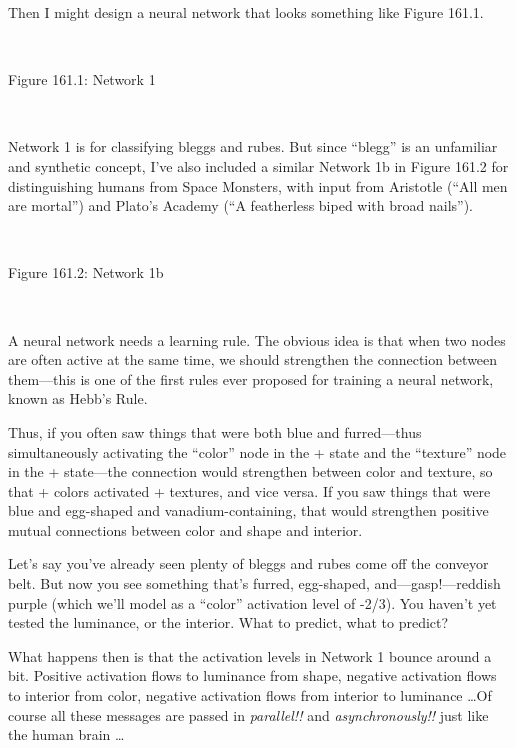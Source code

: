 {
 Then I might design a neural network that looks something like
Figure 161.1.}

{
 ~}

{\centering
{}
 \newline
 Figure 161.1: Network 1
\par}


\bigskip

{
 ~}

{
 Network 1 is for classifying bleggs and rubes. But since
``blegg'' is an unfamiliar and
synthetic concept, I've also included a similar Network
1b in Figure 161.2 for distinguishing humans from Space Monsters, with
input from Aristotle (``All men are
mortal'') and Plato's Academy
(``A featherless biped with broad
nails'').}

{
 ~}

{\centering
{}
 \newline
 Figure 161.2: Network 1b
\par}


\bigskip

{
 ~}

{
 A neural network needs a learning rule. The obvious idea is that
when two nodes are often active at the same time, we should strengthen
the connection between them---this is one of the first rules ever
proposed for training a neural network, known as Hebb's
Rule.}

{
 Thus, if you often saw things that were both blue and
furred---thus simultaneously activating the
``color'' node in the + state and
the ``texture'' node in the +
state---the connection would strengthen between color and texture, so
that + colors activated + textures, and vice versa. If you saw things
that were blue and egg-shaped and vanadium-containing, that would
strengthen positive mutual connections between color and shape and
interior.}

{
 Let's say you've already seen
plenty of bleggs and rubes come off the conveyor belt. But now you see
something that's furred, egg-shaped,
and---gasp!---reddish purple (which we'll model as a
``color'' activation level of -2/3).
You haven't yet tested the luminance, or the interior.
What to predict, what to predict?}

{
 What happens then is that the activation levels in Network 1
bounce around a bit. Positive activation flows to luminance from shape,
negative activation flows to interior from color, negative activation
flows from interior to luminance \ldots Of course all these messages are
passed in \textit{parallel!!} and \textit{asynchronously!!} just like
the human brain \ldots}

